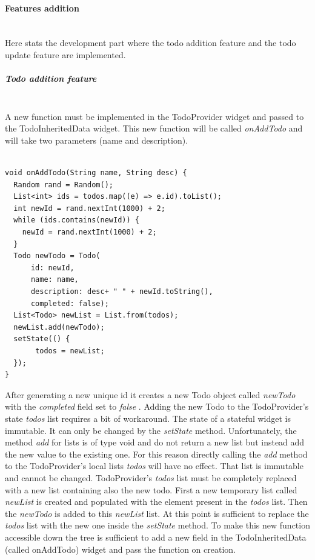 \paragraph{Features addition} \mbox{} \\
\label{par:feature_addition_inherited_widget}
Here stats the development part where the todo addition feature and the todo update feature are implemented.

\subparagraph{Todo addition feature} \mbox{} \\
\label{subpar: todo_addition_feature_inherited_widget}
A new function must be implemented in the TodoProvider widget and passed to the TodoInheritedData widget. This new function will be called \textit{onAddTodo} and will take two parameters (name and description).
\mbox{}\\


\begin{verbatim}

void onAddTodo(String name, String desc) {
  Random rand = Random();
  List<int> ids = todos.map((e) => e.id).toList();
  int newId = rand.nextInt(1000) + 2;
  while (ids.contains(newId)) {
    newId = rand.nextInt(1000) + 2;
  }
  Todo newTodo = Todo(
      id: newId,
      name: name,
      description: desc+ " " + newId.toString(),
      completed: false);
  List<Todo> newList = List.from(todos);
  newList.add(newTodo);
  setState(() {
       todos = newList;
  });
}
\end{verbatim}

After generating a new unique id it creates a new Todo object called \textit{newTodo }with the \textit{completed }field set to \textit{false }. Adding the new Todo to the TodoProvider’s state \textit{todos }list requires a bit of workaround. The state of a stateful widget is immutable. It can only be changed by the \textit{setState } method. Unfortunately, the method \textit{add} for lists is of type void and do not return a new list but instead add the new value to the existing one. For this reason directly calling the \textit{add} method to the TodoProvider’s local lists \textit{todos }will have no effect. That list is immutable and cannot be changed.
TodoProvider’s \textit{todos }list must be completely replaced with a new list containing also the new todo. First a new temporary list called \textit{newList} is created and populated with the element present in the \textit{todos }list. Then the \textit{newTodo }is added to this \textit{newList} list. At this point is sufficient to replace the \textit{todos }list with the new one inside the \textit{setState} method.
To make this new function accessible down the tree is sufficient to add a new field in the TodoInheritedData (called onAddTodo) widget and pass the function on creation.
\mbox{}\\


